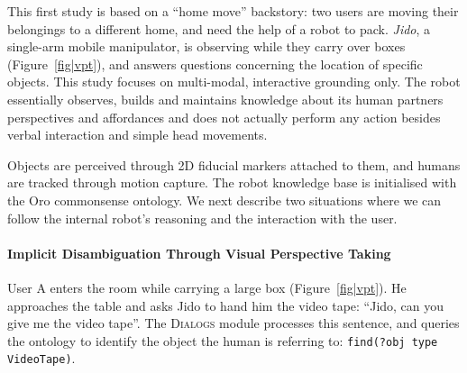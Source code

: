 \documentclass[preprint,3p,times]{elsarticle}
\newcommand{\concept}[1]{{\small \texttt{#1}}}
\begin{document}
This first study is based on a ``home move'' backstory: two users are moving
their belongings to a different home, and need the help of a robot to pack.
\emph{Jido}, a single-arm mobile manipulator, is observing while they carry
over boxes (Figure~\ref{fig|vpt}), and answers questions concerning the
location of specific objects.  This study focuses on multi-modal, interactive
grounding only. The robot essentially observes, builds and maintains knowledge about its human
partners perspectives and affordances and does not actually perform any action besides
verbal interaction and simple head movements.

Objects are perceived through 2D fiducial markers attached to them, and humans are
tracked through motion capture. The robot knowledge base is initialised with
the {\sc Oro} commonsense ontology.  We next describe two
situations where we can follow the internal robot's reasoning and the
interaction with the user.

\paragraph{Implicit Disambiguation Through Visual Perspective Taking}

\begin{figure}[!ht]
  \centering
\end{figure}


User A enters the room while carrying a large box (Figure~\ref{fig|vpt}). He
approaches the table and asks Jido to hand him the video tape: ``Jido, can
you give me the video tape''. The \textsc{Dialogs} module processes this
sentence, and queries the ontology to
identify the object the human is referring to: \concept{find(?obj type
VideoTape)}. 
\end{document}
